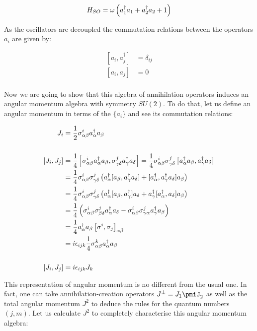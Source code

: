 \begin{equation*}
H_{SO} = \omega\left( a_1^\dagger a_1 + a_2^\dagger a_2 + 1 \right)
\end{equation*}

As the oscillators are decoupled the commutation relations between the operators $a_i$ are given by:

\begin{align*}
\left[ a_i,a_j^\dagger\right] &= \delta_{ij}\\
\left[ a_i,a_j\right] &= 0\\
\end{align*}
 
Now we are going to show that this algebra of annihilation operators induces an angular momentum algebra with symmetry $SU(2)$. To do that, let us define an angular momentum in terms of the $\{a_i\}$ and see its commutation relations:

\begin{align*}
J_i &= \frac{1}{2}\sigma^i_{\alpha\beta}a^\dagger_\alpha a_\beta \\
\\
[J_i,J_j] &= \frac{1}{4}\left[ \sigma^i_{\alpha\beta}a^\dagger_\alpha a_\beta,\sigma^j_{\gamma\delta}a^\dagger_\gamma a_\delta \right] = \frac{1}{4}\sigma^i_{\alpha\beta}\sigma^j_{\gamma\delta}\left[ a^\dagger_\alpha a_\beta,a^\dagger_\gamma a_\delta \right]\\
&= \frac{1}{4}\sigma^i_{\alpha\beta}\sigma^j_{\gamma\delta}\left( a^\dagger_\alpha [a_\beta,a^\dagger_\gamma a_\delta]+  [a^\dagger_\alpha,a^\dagger_\gamma a_\delta]a_\beta \right)\\
&= \frac{1}{4}\sigma^i_{\alpha\beta}\sigma^j_{\gamma\delta}\left( a^\dagger_\alpha [a_\beta,a^\dagger_\gamma ]a_\delta +  a^\dagger_\gamma[a^\dagger_\alpha, a_\delta]a_\beta  \right)\\
&= \frac{1}{4}\left( \sigma^i_{\alpha\beta}\sigma^j_{\beta\delta}a^\dagger_\alpha a_\delta - \sigma^i_{\alpha\beta}\sigma^j_{\gamma\alpha}a^\dagger_\gamma a_\beta  \right)\\
&= \frac{1}{4}a^\dagger_\alpha a_\beta \left[ \sigma^i,\sigma_j \right]_{\alpha\beta}\\
&= i\epsilon_{ijk} \frac{1}{4} \sigma^k_{\alpha\beta}a^\dagger_\alpha a_\beta \\
\\
[J_i,J_j] &= i\epsilon_{ijk}J_k
\end{align*}

This representation of angular momentum is no different from the usual one. In fact, one can take annihilation-creation operators $J^\pm = J_1\pmiJ_2$ as well as the total angular momentum $J^2$ to deduce the rules for the quantum numbers $(j,m)$. Let us calculate $J^2$ to completely characterise this angular momentum algebra:





